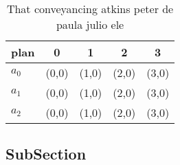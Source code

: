 \documentclass[a4paper]{article}
\begin{document}
\begin{table}
\begin{adjustbox}{width=0.6\columnwidth}
\begin{tabular}{|l|l|l|l|l|}
\hline
\textbf{plan} & \multicolumn{1}{c|}{\textbf{0}} & \multicolumn{1}{c|}{\textbf{1}} & \multicolumn{1}{c|}{\textbf{2}} & \multicolumn{1}{c|}{\textbf{3}} \\ \hline
\textbf{$a_0$}  & (0,0) & (1,0) & (2,0) & (3,0) \\ \hline
\textbf{$a_1$}  & (0,0) & (1,0) & (2,0) & (3,0) \\ \hline
\textbf{$a_2$}  & (0,0) & (1,0) & (2,0) & (3,0) \\ \hline
\end{tabular}
\end{adjustbox}
\caption{That conveyancing atkins peter de paula julio ele
}
\end{table}

\subsection{SubSection}
\end{document}
